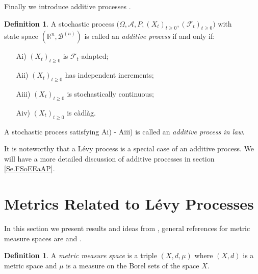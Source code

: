 \documentclass[a4paper, 12pt]{report}
\theoremstyle{remark}
\theoremstyle{definition}
\newtheorem{definition}[theorem]{Definition}
\begin{document}
Finally we introduce additive processes \cite{Sato}.
\begin{definition}
A stochastic process $\big(\Omega, \mathcal{A}, P, (X_t)_{t \ge 0}, (\mathcal{F}_t)_{t \ge 0}\big)$ with\\
state space $(\mathbb{R}^n, \mathcal{B}^{(n)})$ is called an \emph{additive process} if and only if:
\begin{itemize}
\item[Ai)] $(X_t)_{t \ge 0}$ is $\mathcal{F}_t$-adapted;

\item[Aii)] $(X_t)_{t \ge 0}$ has independent increments;

\item[Aiii)] $(X_t)_{t \ge 0}$ is stochastically continuous;

\item[Aiv)] $(X_t)_{t \ge 0}$ is c\`adl\`ag.
\end{itemize}
A stochastic process satisfying Ai) - Aiii) is called an \emph{additive process in law}.
\end{definition}
It is noteworthy that a L\'evy process is a special case of an additive process.  We will have a more detailed discussion of additive processes in section \ref{Se.FSoEEaAP}.


\section{Metrics Related to L\'evy Processes}\label{MRtLP}

In this section we present results and ideas from \cite{Paper}, general references for metric measure spaces are \cite{22in8} and \cite{45in8}.
\begin{definition}
A \emph{metric measure space} is a triple $(X, d, \mu)$ where $(X, d)$ is a metric space and $\mu$ is a measure on the Borel sets of the space $X$.
\end{definition}
\end{document}

